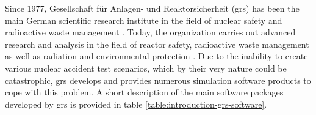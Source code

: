 Since 1977, Gesellschaft für Anlagen- und Reaktorsicherheit (\acrshort{grs}) has been the main German scientific research institute in the field of nuclear safety and radioactive waste management \cite{grs:grs-general-info}. Today, the organization carries out advanced research and analysis in the field of reactor safety, radioactive waste management as well as radiation and environmental protection \cite{grs:grs-general-info}. Due to the inability to create various nuclear accident test scenarios, which by their very nature could be catastrophic, \acrshort{grs} develops and provides numerous simulation software products to cope with this problem. A short description of the main software packages developed by \acrshort{grs} is provided in table \ref{table:introduction-grs-software}.\\


